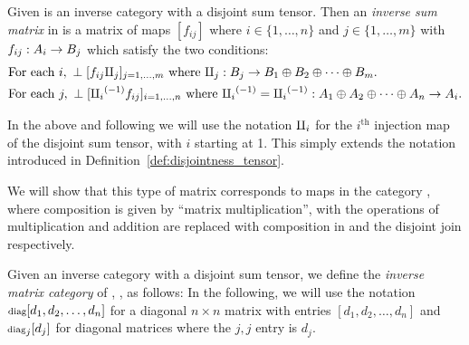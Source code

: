 \begin{definition}\label{def:inverse_sum_matrix}
  Given \X is an inverse category with a disjoint sum tensor. Then an \emph{inverse sum matrix} in \X
  is a matrix of maps $[f_{i j}]$ where $i \in \{1,\ldots, n\}$ and $j \in \{1,\ldots, m\}$ with
  $f_{ij}:A_i \to B_j$ which satisfy the two conditions:
  \begin{align}
    &\text{For each }i,\ \perp[f_{i j} \amalg_{j}]_{j=1,\ldots,m}
    \text{ where } \amalg_{j}: B_j \to B_1\oplus B_2\oplus\cdots\oplus B_m.
      \label{eq:inverse_sum_matrix_row_perp}\\
    &\text{For each }j,\ \perp[{\amalg_{i}}^{(-1)} f_{i j}]_{i=1,\ldots,n}
    \text{ where } {\amalg_{i}}^{(-1)} = {\amalg_{i}}^{(-1)} : A_1\oplus A_2\oplus\cdots\oplus A_n \to A_i.
    \label{eq:inverse_sum_matrix_column_perp}
  \end{align}
\end{definition}

  In the above and following we will use the notation $\amalg_{i}$ for the $i^{\text{th}}$ injection
  map of the disjoint sum tensor, with $i$ starting at 1. This simply extends the notation
  introduced in Definition~\ref{def:disjointness_tensor}.

  We will show that this type of matrix corresponds to maps in the category \imatx, where
  composition is given by ``matrix multiplication'', with the operations of multiplication and
  addition are replaced with composition in \X and the disjoint join respectively.

\begin{definition}\label{def:inverse_matrix_category}
  Given an inverse category \X with a disjoint sum tensor, we define the \emph{inverse
  matrix category} of \X, \imatx, as follows:
  In the following, we will use the notation $\operatorname{\scriptstyle{diag}}[d_1,d_2,\ldots,d_n]$ for a diagonal $n\times n$
  matrix with entries $[d_1,d_2,\ldots,d_n]$ and $\operatorname{\scriptstyle{diag}}_j[d_j]$ for diagonal matrices where the
  $j,j$ entry is $d_j$.
\end{definition}

